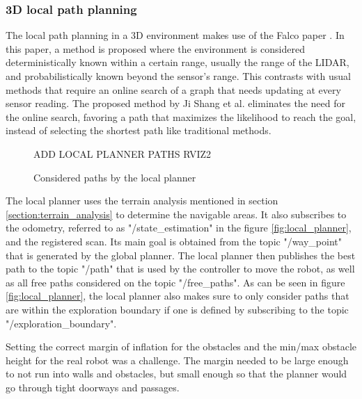 \documentclass[11pt]{article}
\begin{document}

        \subsubsection{3D local path planning}
        \label{section:local_path_planning}

        The local path planning in a 3D environment makes use of the Falco paper \cite{zhang2020falco}. In this paper, a method is proposed where the environment is considered deterministically known within a certain range, usually the range of the LIDAR, and probabilistically known beyond the sensor's range. This contrasts with usual methods that require an online search of a graph that needs updating at every sensor reading. The proposed method by Ji Shang et al. eliminates the need for the online search, favoring a path that maximizes the likelihood to reach the goal, instead of selecting the shortest path like traditional methods.

        \begin{figure}[H]
            \centering
            \color{red}
            ADD LOCAL PLANNER PATHS RVIZ2
            \caption{Considered paths by the local planner}
        \end{figure}


        The local planner uses the terrain analysis mentioned in section \ref{section:terrain_analysis} to determine the navigable areas. It also subscribes to the odometry, referred to as "/state\_estimation" in the figure \ref{fig:local_planner}, and the registered scan. Its main goal is obtained from the topic "/way\_point" that is generated by the global planner. The local planner then publishes the best path to the topic "/path" that is used by the controller to move the robot, as well as all free paths considered on the topic "/free\_paths". As can be seen in figure \ref{fig:local_planner}, the local planner also makes sure to only consider paths that are within the exploration boundary if one is defined by subscribing to the topic "/exploration\_boundary".

        Setting the correct margin of inflation for the obstacles and the min/max obstacle height for the real robot was a challenge. The margin needed to be large enough to not run into walls and obstacles, but small enough so that the planner would go through tight doorways and passages. 
\end{document}

